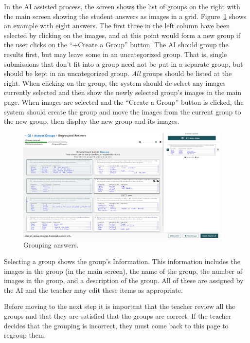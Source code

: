 \documentclass[ms,twoside,print]{nuthesis}
\begin{document}
In the AI assisted process, the screen shows the list of groups on the right with the main screen showing the student answers as images in a grid. Figure~\ref{fig:answer-grouping} shows an example with eight answers. The first three in the left column have been selected by clicking on the images, and at this point would form a new group if the user clicks on the ``+Create a Group'' button. The AI should group the results first, but may leave some in an uncategorized group. That is, single submissions that don't fit into a group need not be put in a separate group, but should be kept in an uncategorized group. \textit{All} groups should be listed at the right. When clicking on the group, the system should de-select any images currently selected and then show the newly selected group's images in the main page. When images are selected and the ``Create a Group'' button is clicked, the system should create the group and move the images from the current group to the new group, then display the new group and its images. 

\begin{figure}[htb]
    \centering
    \includegraphics[width=0.95\textwidth]{images/grouping-answers.png}
    \caption{Grouping answers.}
    \label{fig:answer-grouping}
\end{figure}

Selecting a group shows the group's Information. This information includes the images in the group (in the main screen), the name of the group, the number of images in the group, and a description of the group. All of these are assigned by the AI and the teacher may edit these items as appropriate. 

Before moving to the next step it is important that the teacher review all the groups and that they are satisfied that the groups are correct. If the teacher decides that the grouping is incorrect, they must come back to this page to regroup them. 
\end{document}
